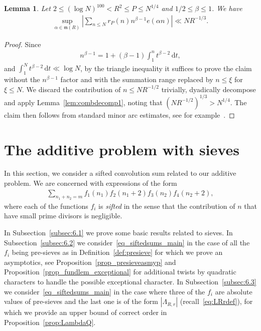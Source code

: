 \documentclass[12pt]{amsart}
\newtheorem{lemma}[theorem]{Lemma}
\theoremstyle{definition}
\theoremstyle{remark}
\numberwithin{equation}{section}
\newcommand{\1}{\mathbf{1}}
\renewcommand\d{\,\mathrm{d}}
\begin{document}
\begin{lemma}\label{lem:roughexceptionalminorarc}
   Let $2\leq (\log N)^{100}<R^2\leq P\leq N^{1/4}$ and $1/2\leq \beta \leq 1$. We have
    \begin{align*}
        \sup_{\alpha\in \mathfrak{m}(R)} \left|\sum_{n\leq N} r_P(n)n^{\beta-1} e(\alpha n)\right|\ll N R^{-1/3}.
    \end{align*}
\end{lemma}
\begin{proof}
Since
\begin{align}\label{eq:expnbeta}
n^{\beta-1}=1+(\beta-1)\int_{1}^{n}t^{\beta-2}\d t,    
\end{align}
and $\int_{1}^{N}t^{\beta-2}\d t\ll \log N$, by the triangle inequality it suffices to prove the claim without the $n^{\beta-1}$ factor and with the summation range replaced by $n\leq \xi$ for $\xi\leq N$. We discard the contribution of $n\leq NR^{-1/2}$ trivially, dyadically decompose and apply Lemma~\ref{lem:combdecomp1}, noting that $(N R^{-1/2})^{1/3}>N^{1/4}$. The claim then follows from standard minor arc estimates, see for example~\cite[Lemmas 13.7 and 13.8]{iw-kow}.
\end{proof}



\section{The additive problem with sieves}\label{sec:SiftedSums}

In this section, we consider a sifted convolution sum related to our additive problem. We are concerned with expressions of the form 
\begin{align} \label{eq_siftedsums_main}
    \sum_{n_1+n_2=m}f_1(n_1)f_2(n_1+2)f_3(n_2)f_4(n_2+2),
\end{align}
where each of the functions $f_i$ is \emph{sifted} in the sense that the contribution of $n$ that have small prime divisors is negligible.

In Subsection~\ref{subsec:6.1} we prove some basic results related to sieves. In Subsection~\ref{subsec:6.2} we consider~\eqref{eq_siftedsums_main} in the case of all the $f_i$ being pre-sieves as in Definition~\ref{def:presieve} for which we prove an asymptotics, see Proposition~\ref{prop_presieveasmyp} and Proposition~\ref{prop_fundlem_exceptional} for additional twists by quadratic characters to handle the possible exceptional character. In Subsection~\ref{subsec:6.3} we consider~\eqref{eq_siftedsums_main} in the case where three of the $f_i$ are absolute values of pre-sieves and the last one is of the form $|\Lambda_{R,r}|$ (recall~\eqref{eq:LRrdef}), for which we provide an upper bound of correct order in Proposition~\ref{prop:LambdaQ}.
\end{document}
